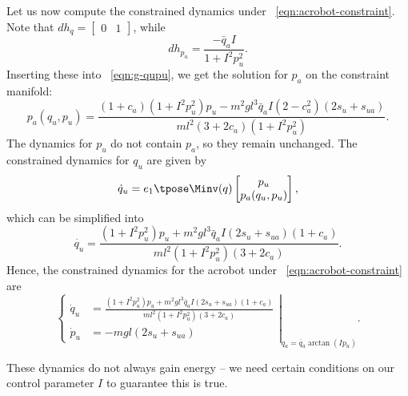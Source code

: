 Let us now compute the constrained dynamics under
~\eqref{eqn:acrobot-constraint}.
Note that \(dh_q = \begin{bmatrix}0 & 1\end{bmatrix}\), while
\[
    dh_{p_u} = \frac{-\bar{q}_a I}{1 + I^2 p_u^2}
    .
\]
Inserting these into ~\eqref{eqn:g-qupu}, we get the solution for \(p_a\) on the
constraint manifold:
\[
    p_a(q_u,p_u) = \frac{
        (1+c_a)(1+I^2 p_u^2)p_u - m^2gl^3\bar{q}_a I (2-c_a^2)(2s_u + s_{ua})
    }{ml^2(3+2c_a)(1+I^2 p_u^2)}
    .
\]
The dynamics for \(p_u\) do not contain \(p_a\), so they remain unchanged.
The constrained dynamics for \(q_u\) are given by 
\begin{equation*}
    \dot{q}_u = e_1\tpose \Minv(q) \begin{bmatrix}
                    p_u \\ p_a(q_u,p_u)
                \end{bmatrix} %
    ,
\end{equation*}
which can be simplified into 
\begin{equation*}
    \dot{q_u} = \frac{(1+I^2 p_u^2)p_u + m^2gl^3\bar{q}_a I(2s_u + s_{ua})(1+c_a) }{ml^2(1+I^2 p_u^2)(3+2c_a)}
    .
\end{equation*}
Hence, the constrained dynamics for the acrobot under
~\eqref{eqn:acrobot-constraint} are
\begin{equation}\label{eqn:acrobot-constrained-dynamics}
\left.\begin{cases}
    \dot{q}_u &= \frac{(1+I^2 p_u^2)p_u + m^2gl^3\bar{q}_a I(2s_u + s_{ua})(1+c_a) }
            {ml^2(1+I^2 p_u^2)(3+2c_a)}
        \\
    \dot{p}_u &= - m g l (2s_u + s_{ua})
    \end{cases} \right|_{q_a = \bar{q}_a\arctan(Ip_u)}
    .
\end{equation}

These dynamics do not always gain energy -- we need certain conditions on our
control parameter \(I\) to guarantee this is true.

